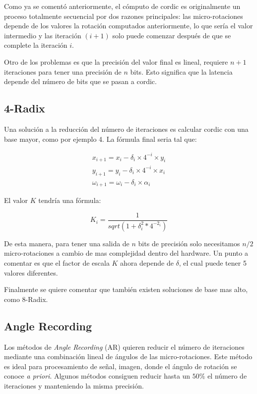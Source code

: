 Como ya se comentó anteriormente, el cómputo de \gls{cordic} es originalmente un proceso totalmente secuencial por dos razones principales: las micro-rotaciones depende de los valores la rotación computados anteriormente, lo que sería el valor intermedio y las iteración $(i+1)$ solo puede comenzar después de que se complete la iteración $i$.

Otro de los problemas es que la precisión del valor final es lineal, requiere $n+1$ iteraciones para tener una precisión de $n$ bits. Esto significa que la latencia depende del número de bits que se pasan a \gls{cordic}.

\subsection{4-Radix}
Una solución a la reducción del número de iteraciones es calcular \gls{cordic} con una base mayor, como por ejemplo 4. La fórmula final seria tal que:

\[
\begin{matrix}
x_{i+1} = x_{i} - \delta_{i} \times 4^{-i} \times y_{i} \\
y_{i+1} = y_{i} - \delta_{i} \times 4^{-i} \times x_{i} \\
\omega_{i+1} =  \omega_{i} - \delta_{i} \times \alpha_{i}
\end{matrix}
\]

El valor $K$ tendría una fórmula:

\[
K_{i} = \frac{1}{sqrt{(1+\delta_i^2*4^{-2_{i}})}}
\]

De esta manera, para tener una salida de $n$ bits de precisión solo necesitamos $n/2$ micro-rotaciones a cambio de mas complejidad dentro del hardware. Un punto a comentar es que el factor de escala $K$ ahora depende de $\delta$, el cual puede tener 5 valores diferentes.

Finalmente se quiere comentar que también existen soluciones de base mas alto, como 8-Radix.

\subsection{Angle Recording}
Los métodos de \textit{Angle Recording} (AR) quieren reducir el número de iteraciones mediante una combinación lineal de ángulos de las micro-rotaciones. Este método es ideal para procesamiento de señal, imagen, donde el ángulo de rotación se conoce \textit{a priori}. Algunos métodos consiguen reducir hasta un $50\%$ el número de iteraciones y manteniendo la misma precisión. \cite{hu_angle_1993}

